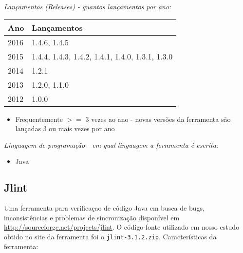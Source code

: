 \begin{description}

  \item {\it Lançamentos ({\it Releases}) - quantos lançamentos por ano:}
    \begin{table}[h!]
      \centering
      \begin{tabular}{| l | l |}
        \hline
        Ano  & Lançamentos                                     \\
        \hline
        2016 & 1.4.6, 1.4.5                                    \\
        2015 & 1.4.4, 1.4.3, 1.4.2, 1.4.1, 1.4.0, 1.3.1, 1.3.0 \\
        2014 & 1.2.1                                           \\
        2013 & 1.2.0, 1.1.0                                    \\
        2012 & 1.0.0                                           \\
        \hline
      \end{tabular}
    \end{table}
    \begin{itemize}
      \item Frequentemente $>=$ 3 vezes ao ano - novas versões da ferramenta são lançadas 3 ou mais vezes por ano
    \end{itemize}

  \item {\it Linguagem de programação - em qual linguagem a ferramenta é escrita:}
    \begin{itemize}
      \item Java
    \end{itemize}

\end{description}

\subsection{Jlint}

Uma ferramenta para verificaçao de código Java em busca de bugs,
inconsistências e problemas de sincronização disponível em
\url{http://sourceforge.net/projects/jlint}.  O código-fonte utilizado em
nosso estudo obtido no site da ferramenta foi o \texttt{jlint-3.1.2.zip}.
Características da ferramenta:

